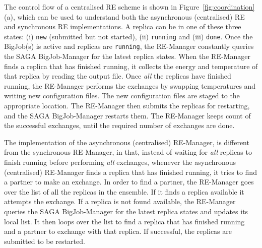 \documentclass{rspublic}
\newcommand{\alnote}[1]{ {\textcolor{blue} { ***andre: #1 }}}
\newcommand{\alnote}[1]{}
\begin{document}


The control flow of a centralised RE scheme is shown in
Figure~\ref{fig:coordination}(a), which can be used to understand both
the asynchronous (centralised) RE and synchronous RE implementations.
A replica can be in one of these three states: (i) \texttt{new} (submitted but not started), (ii) \texttt{running} and (iii) \texttt{done}.
Once the BigJob(s) is active and replicas are \texttt{running}, the RE-Manager constantly
queries the SAGA BigJob-Manager for the latest replica states.  When
the RE-Manager finds a replica that has finished running, it collects
the energy and temperature of that replica by reading the output
file. Once \emph{all} the replicas have finished running, the
RE-Manager performs the exchanges by swapping temperatures and writing
new configuration files. The new configuration files are staged to the
appropriate location. The RE-Manager then submits the replicas for
restarting, and the SAGA BigJob-Manager restarts them. The RE-Manager
keeps count of the successful exchanges, until the required number of
exchanges are done.

The implementation of the asynchronous (centralised) RE-Manager, is
different from the synchronous RE-Manager, in that, instead of waiting
for \emph{all} replicas to finish running before performing \emph{all}
exchanges, whenever the asynchronous (centralised) RE-Manager finds a
replica that has finished running, it tries to find a partner to make
an exchange. In order to find a partner, the RE-Manager goes over the
list of all the replicas in the ensemble. If it finds a replica
available it attempts the exchange. If a replica is not found
available, the RE-Manager queries the SAGA BigJob-Manager for the
latest replica states and updates its local list. It then loops over
the list to find a replica that has finished running and a partner to
exchange with that replica.  If successful, the replicas are submitted
to be restarted. %
\end{document}
